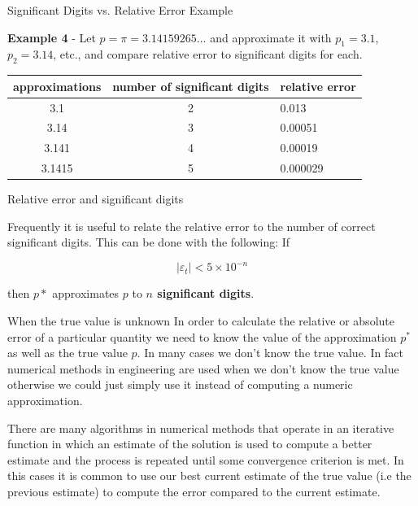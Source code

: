 \documentclass[12pt]{beamer}
\begin{document}
\begin{frame}{Significant Digits vs. Relative Error Example } 

{\bf Example 4} - Let $p = \pi = 3.14159265 \dots$ and approximate it with $p_1=3.1$, $p_2=3.14$, etc., and compare relative error to significant digits for each.

\vspace{0.5 in}

\begin{table} 
\begin{tabular}{|c|c|l|}
\hline 
approximations & number of significant digits & relative error
\\
\hline
3.1                   & 2       & 0.013 \\
\hline 
3.14                 & 3       & 0.00051 \\ 
\hline 
3.141               & 4       & 0.00019 \\ 
\hline 
3.1415             & 5       & 0.000029 \\ 
\hline 
\end{tabular} 
\end{table} 

\vspace{0.5 in}

\end{frame}

\begin{frame}{Relative error and significant digits} 

Frequently it is useful to relate the relative error to the number of
correct significant digits. This can be done with the
following: If

\begin{equation} 
|\varepsilon_{t} | < 5 \times 10 ^ {-n} 
\end{equation} 

\noindent 
then $p*$ approximates $p$ to {\bf $n$ significant digits}. 
\end{frame} 

\begin{frame}{When the true value is unknown} 
In order to calculate the relative or absolute error of a particular
quantity we need to know the value of the approximation $p^*$ as well
as the true value $p$. In many cases we don't know the true value. 
In fact numerical methods in engineering are used when we don't know
the true value otherwise we could just simply use it instead of
computing a numeric approximation. 

There are many algorithms in numerical methods that operate in an
iterative function in which an estimate of the solution is used to compute 
a better estimate and the process is repeated until some convergence
criterion is met. In this cases it is common to use our best current
estimate of the true value (i.e the previous estimate) to compute the
error compared to the current estimate. 
\end{frame}
\end{document}
